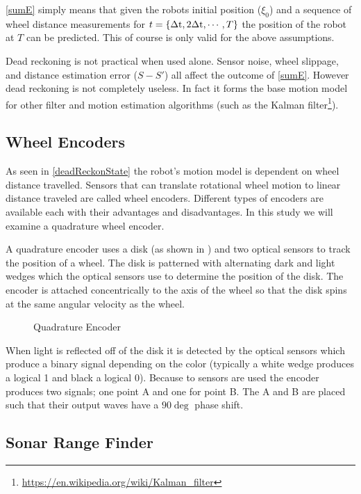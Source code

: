 \documentclass[main.tex]{subfiles}
\begin{document}
\eqref{sumE} simply means that given the robots initial position ($\xi_0$) and a sequence
of wheel distance measurements for $t=\{\Delta\mathrm{t},2\Delta\mathrm{t},\cdots,T\}$ the position of
the robot at $T$ can be predicted. This of course is only valid for the above
assumptions.

Dead reckoning is not practical when used alone. Sensor noise, wheel slippage,
and distance estimation error ($S-S\mathrm{'}$) all affect the outcome of
\eqref{sumE}. However dead reckoning is not completely useless. In fact it forms
the base motion model for other filter and motion estimation algorithms (such as
the Kalman filter\footnote{\url{https://en.wikipedia.org/wiki/Kalman_filter}}).


\subsection{Wheel Encoders}

As seen in \eqref{deadReckonState} the robot's motion model is dependent on
wheel distance travelled. Sensors that can translate rotational wheel motion to
linear distance traveled are called wheel encoders. Different types of encoders
are available each with their advantages and disadvantages. In this study we
will examine a quadrature wheel encoder. 

A quadrature encoder uses a disk (as shown in ) and two
optical sensors to track the position of a wheel. The disk is patterned with
alternating dark and light wedges which the optical sensors use to determine the
position of the disk. The encoder is attached concentrically to the axis of the
wheel so that the disk spins at the same angular velocity as the wheel.

\begin{figure}[H]
	\begin{center}
	
	\end{center}
	\caption{Quadrature Encoder}
	\label{fig:quadEncode}
\end{figure}

When light is reflected off of the disk it is detected by the optical sensors
which produce a binary signal depending on the color (typically a white wedge
produces a logical 1 and black a logical 0). Because to sensors are used the
encoder produces two signals; one point A and one for point B. The A and B are
placed such that their output waves have a $90\deg$ phase shift.

\subsection{Sonar Range Finder}
\end{document}
